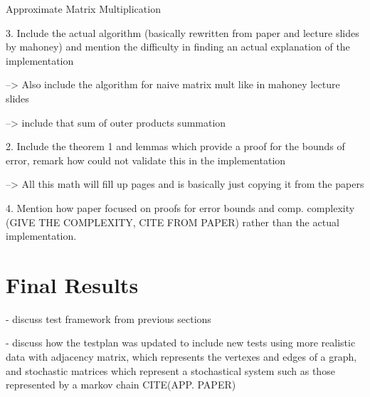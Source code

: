 \documentclass[oneside]{article}
\begin{document}
\begin{algorithm}[!ht]
  \SetAlgoNoLine
  \DontPrintSemicolon
\caption{Approximate Matrix Multiplication}
\label{alg:approx}
\end{algorithm}


3. Include the actual algorithm (basically rewritten from paper and lecture slides by mahoney) and mention the difficulty in finding an actual explanation of the implementation

    --> Also include the algorithm for naive matrix mult like in mahoney
        lecture slides

    --> include that sum of outer products summation


2. Include the theorem 1 and lemmas which provide a proof for the bounds of error, remark how could not validate this in the implementation

    --> All this math will fill up pages and is basically just copying it from the papers


4. Mention how paper focused on proofs for error bounds and comp. complexity (GIVE THE COMPLEXITY, CITE FROM PAPER) rather than the
actual implementation.







\section{Final Results}

- discuss test framework from previous sections

- discuss how the testplan was updated to include new tests using more realistic data with adjacency matrix, which represents the vertexes and edges of a graph, and stochastic matrices which represent a stochastical
system such as those represented by a markov chain CITE(APP. PAPER)
\end{document}
